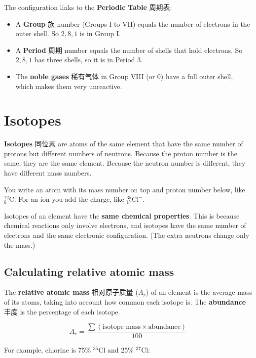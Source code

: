 \documentclass[11pt]{article}
\begin{document}
The configuration links to the \textbf{Periodic Table} 周期表:

\begin{itemize}
\item A \textbf{Group} 族 number (Groups I to VII) equals the number of electrons in the outer shell. So $2,8,1$ is in Group I.

\item A \textbf{Period} 周期 number equals the number of shells that hold electrons. So $2,8,1$ has three shells, so it is in Period 3.

\item The \textbf{noble gases} 稀有气体 in Group VIII (or 0) have a full outer shell, which makes them very unreactive.

\end{itemize}

\section*{Isotopes}

\textbf{Isotopes} 同位素 are atoms of the same element that have the same number of protons but different numbers of neutrons. Because the proton number is the same, they are the same element. Because the neutron number is different, they have different mass numbers.

You write an atom with its mass number on top and proton number below, like $^{12}_{6}\text{C}$. For an ion you add the charge, like $^{35}_{17}\text{Cl}^{-}$.

Isotopes of an element have the \textbf{same chemical properties}. This is because chemical reactions only involve electrons, and isotopes have the same number of electrons and the same electronic configuration. (The extra neutrons change only the mass.)

\subsection*{Calculating relative atomic mass}

The \textbf{relative atomic mass} 相对原子质量 ($A_r$) of an element is the average mass of its atoms, taking into account how common each isotope is. The \textbf{abundance} 丰度 is the percentage of each isotope.

\[
A_r = \frac{\sum (\text{isotope mass} \times \text{abundance})}{100}
\]

For example, chlorine is 75\% $^{35}\text{Cl}$ and 25\% $^{37}\text{Cl}$:
\end{document}
